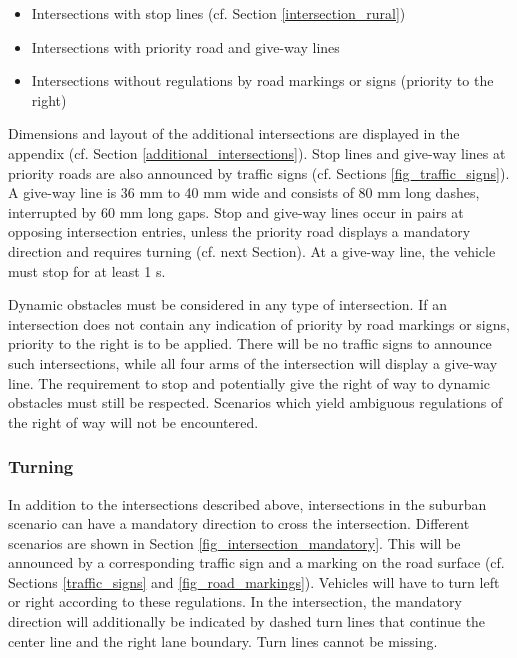 \begin{itemize}
	\item Intersections with stop lines (cf. Section \ref{intersection_rural})
	\item Intersections with priority road and give-way lines
	\item Intersections without regulations by road markings or signs (priority to the
	      right)
\end{itemize}

Dimensions and layout of the additional intersections are displayed in the
appendix (cf. Section \ref{additional_intersections}). Stop lines and give-way
lines at priority roads are also announced by traffic signs (cf. Sections
\ref{fig_traffic_signs}). A give-way line is 36 mm to 40 mm wide and consists
of 80 mm long dashes, interrupted by 60 mm long gaps. Stop and give-way lines
occur in pairs at opposing intersection entries, unless the priority road
displays a mandatory direction and requires turning (cf. next Section). At a
give-way line, the vehicle must stop for at least 1 s.

Dynamic obstacles must be considered in any type of intersection. If an
intersection does not contain any indication of priority by road markings or
signs, priority to the right is to be applied. There will be no traffic signs
to announce such intersections, while all four arms of the intersection will
display a give-way line. The requirement to stop and potentially give the right
of way to dynamic obstacles must still be respected. Scenarios which yield
ambiguous regulations of the right of way will not be encountered.

\subsubsection{Turning}
\label{turning}

In addition to the intersections described above, intersections in the suburban
scenario can have a mandatory direction to cross the intersection. Different
scenarios are shown in Section \ref{fig_intersection_mandatory}. This will be
announced by a corresponding traffic sign and a marking on the road surface
(cf. Sections \ref{traffic_signs} and \ref{fig_road_markings}). Vehicles will
have to turn left or right according to these regulations. In the intersection,
the mandatory direction will additionally be indicated by dashed turn lines
that continue the center line and the right lane boundary. Turn lines cannot be
missing.

